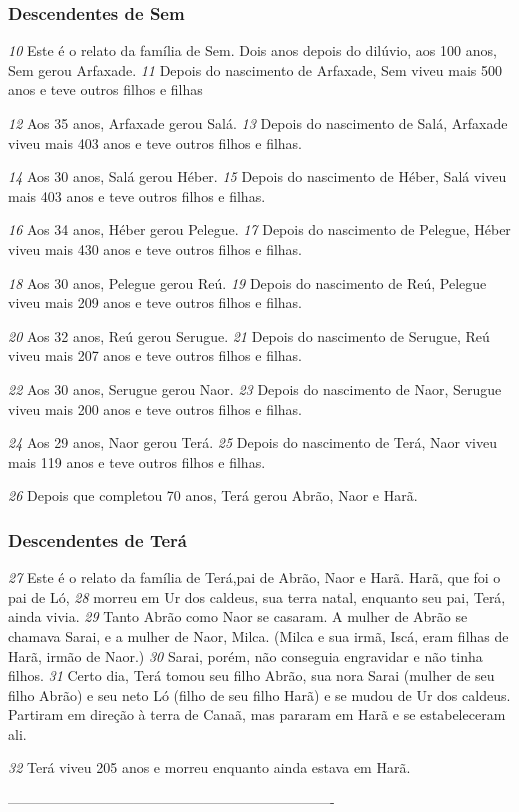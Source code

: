 \bigskip
\subsubsection*{Descendentes de Sem}
\textit{\tiny 10}
 Este é o relato da família de Sem. Dois anos depois do dilúvio, aos 100 anos, Sem gerou Arfaxade. 
\textit{\tiny 11}
 Depois do nascimento de Arfaxade, Sem viveu mais 500 anos e teve outros filhos e filhas



\bigskip
\textit{\tiny 12}
 Aos 35 anos, Arfaxade gerou Salá. 
\textit{\tiny 13}
 Depois do nascimento de Salá, Arfaxade viveu mais 403 anos e teve outros filhos e filhas.



\bigskip
\textit{\tiny 14}
 Aos 30 anos, Salá gerou Héber. 
\textit{\tiny 15}
 Depois do nascimento de Héber, Salá viveu mais 403 anos e teve outros filhos e filhas.



\bigskip
\textit{\tiny 16}
 Aos 34 anos, Héber gerou Pelegue. 
\textit{\tiny 17}
 Depois do nascimento de Pelegue, Héber viveu mais 430 anos e teve outros filhos e filhas.


\bigskip
\textit{\tiny 18}
 Aos 30 anos, Pelegue gerou Reú. 
\textit{\tiny 19}
 Depois do nascimento de Reú, Pelegue viveu mais 209 anos e teve outros filhos e filhas.


\bigskip
\textit{\tiny 20}
 Aos 32 anos, Reú gerou Serugue. 
\textit{\tiny 21}
 Depois do nascimento de Serugue, Reú viveu mais 207 anos e teve outros filhos e filhas.


\bigskip
\textit{\tiny 22}
 Aos 30 anos, Serugue gerou Naor. 
\textit{\tiny 23}
 Depois do nascimento de Naor, Serugue viveu mais 200 anos e teve outros filhos e filhas.


\bigskip
\textit{\tiny 24}
 Aos 29 anos, Naor gerou Terá. 
\textit{\tiny 25}
 Depois do nascimento de Terá, Naor viveu mais 119 anos e teve outros filhos e filhas.


\bigskip
\textit{\tiny 26}
 Depois que completou 70 anos, Terá gerou Abrão, Naor e Harã.



\bigskip
\subsubsection*{Descendentes de Terá}
\textit{\tiny 27}
 Este é o relato da família de Terá,pai de Abrão, Naor e Harã. Harã, que foi o pai de Ló, 
\textit{\tiny 28}
 morreu em Ur dos caldeus, sua terra natal, enquanto seu pai, Terá, ainda vivia. 
\textit{\tiny 29}
 Tanto Abrão como Naor se casaram. A mulher de Abrão se chamava Sarai, e a mulher de Naor, Milca. (Milca e sua irmã, Iscá, eram filhas de Harã, irmão de Naor.) 
\textit{\tiny 30}
 Sarai, porém, não conseguia engravidar e não tinha filhos. 
\textit{\tiny 31}
 Certo dia, Terá tomou seu filho Abrão, sua nora Sarai (mulher de seu filho Abrão) e seu neto Ló (filho de seu filho Harã) e se mudou de Ur dos caldeus. Partiram em direção à terra de Canaã, mas pararam em Harã e se estabeleceram ali.


\bigskip
\textit{\tiny 32}
Terá viveu 205 anos e morreu enquanto ainda estava em Harã.

----------------------------------------------------------------------
